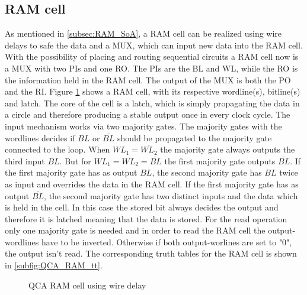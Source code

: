 \subsection{RAM cell}
As mentioned in \ref{subsec:RAM_SoA}, a RAM cell can be realized using wire delays to safe the data and a MUX, which can input new data into the RAM cell. With the possibility of placing and routing sequential circuits a RAM cell now is a MUX with two PIs and one RO. The PIs are the BL and WL, while the RO is the information held in the RAM cell. The output of the MUX is both the PO and the RI.
Figure \ref{fig:QCA_RAM} shows a RAM cell, with its respective wordline(s), bitline(s) and latch. The core of the cell is a latch, which is simply propagating the data in a circle and therefore producing a stable output once in every clock cycle. The input mechanism works via two majority gates. The majority gates with the wordlines decides if $BL$ or $\bar{BL}$ should be propagated to the majority gate connected to the loop. When $WL_1=\bar{WL_2}$ the majority gate always outputs the third input $BL$. But for $WL_1=WL_2=\bar{BL}$ the first majority gate outputs $\bar{BL}$.
If the first majority gate has as output $BL$, the second majority gate has $BL$ twice as input and overrides the data in the RAM cell. If the first majority gate has as output $\bar{BL}$, the second majority gate has two distinct inputs and the data which is held in the cell. In this case the stored bit always decides the output and therefore it is latched meaning that the data is stored. For the read operation only one majority gate is needed and in order to read the RAM cell the output-wordlines have to be inverted. Otherwise if both output-worlines are set to "0", the output isn't read. The corresponding truth tables for the RAM cell is shown in \ref{subfig:QCA_RAM_tt}.
\begin{figure}
	\centering
	\caption{QCA RAM cell using wire delay}\label{fig:QCA_RAM}
\end{figure}